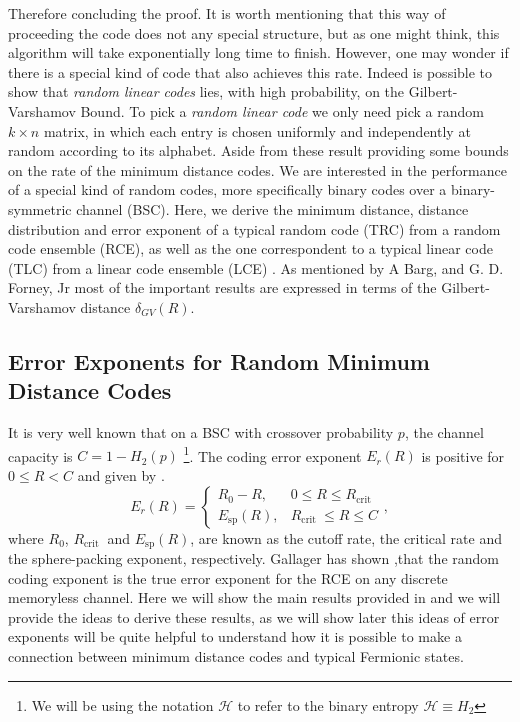 Therefore concluding the proof. It is worth mentioning that this way of proceeding the code does not any special structure, but as one might think, this algorithm will take exponentially long time to finish. However, one may wonder if there is a special kind of code that also achieves this rate. Indeed is possible to show that \textit{random linear codes} lies, with high probability, on the Gilbert-Varshamov Bound. To pick a \textit{random linear code} we only need pick a random $k\times n $ matrix, in which each entry is chosen uniformly and independently at random according to its alphabet\cite{mackay_information_2003,jaynes_probability_2003}. Aside from these result providing some bounds on the rate of the minimum distance codes. We are interested in the performance of a special kind of random codes, more specifically binary codes over a binary-symmetric channel (BSC). Here, we derive the minimum distance, distance distribution and error exponent of a typical random code (TRC) from a random code ensemble (RCE), as well as the one correspondent to a typical linear code (TLC) from a linear code ensemble (LCE) \cite{barg_random_2002}. As mentioned by A Barg, and G. D. Forney, Jr \cite{barg_random_2002} most of the important results are expressed in terms of the Gilbert-Varshamov distance  $\delta_{GV}(R)$.
\subsection{Error Exponents for Random Minimum Distance Codes}
It is very well known that on a BSC with crossover probability $p$, the channel capacity is $C=1-H_2(p)$ \footnote{We will be using the notation $\mathcal{H}$ to refer to the binary entropy $\mathcal{H}\equiv H_2$ }. The coding error exponent $E_r(R)$ is positive for $0\leq R < C$ and given by \cite{gallager_low-density_1962,gallager_information_1968}.
\begin{equation}
E_{r}(R)=\left\{\begin{array}{ll}
R_{0}-R, & 0 \leq R \leq R_{\text {crit }} \\
E_{\mathrm{sp}}(R), & R_{\text {crit }} \leq R \leq C
\end{array}\right.,
\end{equation}
where $R_0$,  $R_{\text {crit }}$ and $E_{\mathrm{sp}}(R)$, are known as the cutoff rate, the critical rate and the sphere-packing exponent, respectively. Gallager has shown \cite{gallager_random_2006},that the random coding exponent is the true error exponent for the RCE   on any discrete memoryless channel. Here we will show the main results provided in \cite{barg_random_2002} and we will provide the ideas to derive these results, as we will show later this ideas of error exponents will be quite helpful to understand how it is possible to make a connection between minimum distance codes and typical Fermionic  states.
